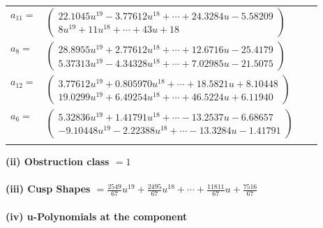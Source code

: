 \documentclass[1p]{elsarticle_modified}
\theoremstyle{definition}
\begin{document}
\begin{tabular}{m{7pt} m{180pt} m{7pt} m{180pt} }
\flushright $a_{11}=$&$\begin{pmatrix}22.1045 u^{19}-3.77612 u^{18}+\cdots+24.3284 u-5.58209\\8 u^{19}+11 u^{18}+\cdots+43 u+18\end{pmatrix}$ \\
\flushright $a_{8}=$&$\begin{pmatrix}28.8955 u^{19}+2.77612 u^{18}+\cdots+12.6716 u-25.4179\\5.37313 u^{19}-4.34328 u^{18}+\cdots+7.02985 u-21.5075\end{pmatrix}$ \\
\flushright $a_{12}=$&$\begin{pmatrix}3.77612 u^{19}+0.805970 u^{18}+\cdots+18.5821 u+8.10448\\19.0299 u^{19}+6.49254 u^{18}+\cdots+46.5224 u+6.11940\end{pmatrix}$ \\
\flushright $a_{6}=$&$\begin{pmatrix}5.32836 u^{19}+1.41791 u^{18}+\cdots-13.2537 u-6.68657\\-9.10448 u^{19}-2.22388 u^{18}+\cdots-13.3284 u-1.41791\end{pmatrix}$\\&\end{tabular}
\flushleft \textbf{(ii) Obstruction class $= 1$}\\~\\
\flushleft \textbf{(iii) Cusp Shapes $= \frac{2549}{67} u^{19}+\frac{2495}{67} u^{18}+\cdots+\frac{11811}{67} u+\frac{7516}{67}$}\\~\\
\newpage\renewcommand{\arraystretch}{1}
\flushleft \textbf{(iv) u-Polynomials at the component}\newline \\
\end{document}
